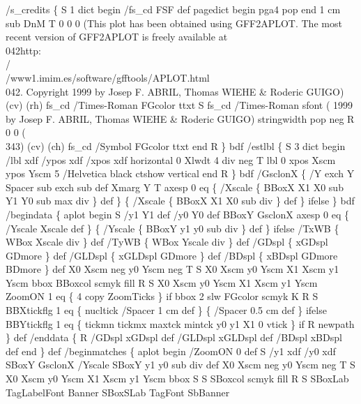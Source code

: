 \documentclass[11pt]{article}
\begin{document}
\nwenddocs{}\endmoddef
%
/s_credits \{
  S 1 dict begin
    /fs_cd FSF def
    pagedict begin
    pga4 pop end 1 cm sub DnM T 0 0 0
(This plot has been obtained using GFF2APLOT. The most recent version of GFF2APLOT is freely available at \\042http:\\/\\/www1.imim.es/software/gfftools/APLOT.html\\042. Copyright      1999 by Josep F. ABRIL, Thomas WIEHE & Roderic GUIGO)
    (cv) (rh) fs_cd /Times-Roman FGcolor ttxt
    S fs_cd /Times-Roman sfont
    (   1999 by Josep F. ABRIL, Thomas WIEHE & Roderic GUIGO)
    stringwidth pop neg R 0 0 (\\343) (cv) (ch) fs_cd /Symbol FGcolor ttxt
    end
  R \} bdf
%
/estlbl \{
  S 3 dict begin
    /lbl xdf /ypos xdf /xpos xdf
    horizontal
      0 Xlwdt 4 div neg T
      lbl 0 xpos Xscm ypos Yscm 5 /Helvetica black ctshow
    vertical
    end
  R \} bdf
%
/GsclonX \{
  /Y exch Y Spacer sub exch sub def
  Xmarg Y T
  axesp 0 eq \{
    /Xscale \{ BBoxX X1 X0 sub Y1 Y0 sub max div \} def
    \} \{
      /Xscale \{ BBoxX X1 X0 sub div \} def
    \} ifelse
  \} bdf
%
/begindata \{
 aplot begin
  S /y1 Y1 def /y0 Y0 def
    BBoxY GsclonX
    axesp 0 eq \{
      /Yscale Xscale def
      \} \{
        /Yscale \{ BBoxY y1 y0 sub div \} def
      \} ifelse
    /TxWB \{ WBox Xscale div \} def /TyWB \{ WBox Yscale div \} def
    /GDspl \{ xGDspl GDmore \} def /GLDspl \{ xGLDspl GDmore \} def
    /BDspl \{ xBDspl GDmore BDmore \} def
    X0 Xscm neg y0 Yscm neg T
    S X0 Xscm y0 Yscm X1 Xscm y1 Yscm bbox BBoxcol scmyk fill R
    S X0 Xscm y0 Yscm X1 Xscm y1 Yscm
      ZoomON 1 eq \{ 4 copy ZoomTicks \} if bbox
      2 slw FGcolor scmyk K
    R
    S BBXtickflg 1 eq \{
        nucltick /Spacer 1 cm def
        \} \{
          /Spacer 0.5 cm def
        \} ifelse
      BBYtickflg 1 eq \{
        tickmn tickmx maxtck mintck y0 y1 X1 0 vtick
        \} if
    R newpath
 \} def
/enddata \{ R /GDspl xGDspl def /GLDspl xGLDspl def /BDspl xBDspl def end \} def
%
/beginmatches \{
 aplot begin 
   /ZoomON 0 def S /y1 xdf /y0 xdf SBoxY GsclonX
   /Yscale SBoxY y1 y0 sub div def
   X0 Xscm neg y0 Yscm neg T S X0 Xscm y0 Yscm X1 Xscm y1 Yscm bbox
   S
     S SBoxcol scmyk fill R
     S SBoxLab TagLabelFont Banner SBoxSLab TagFont SbBanner
\end{document}
